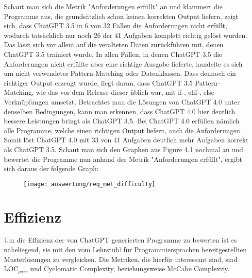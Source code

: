 \documentclass[class=scrbook, crop=false]{standalone}
\begin{document}
    Schaut man sich die Metrik "Anforderungen erfüllt" an und klammert die Programme aus, die grundsätzlich schon keinen korrekten Output liefern,
    zeigt sich, dass ChatGPT 3.5 in 6 von 32 Fällen die Anforderungen nicht erfüllt, wodurch tatsächlich nur noch 26 der 41 Aufgaben komplett richtig gelöst wurden.
    Das lässt sich vor allem auf die veralteten Daten zurückführen mit, denen ChatGPT 3.5 trainiert wurde.
    In allen Fällen, in denen ChatGPT 3.5 die Anforderungen nicht erfüllte aber eine richtige Ausgabe lieferte, handelte es sich um nicht
    verwendetes Pattern-Matching oder Datenklassen.
    Dass dennoch ein richtiger Output erzeugt wurde, liegt daran, dass ChatGPT 3.5 Pattern-Matching, wie das vor dem
    Release dieser üblich war, mit if-, elif-, else-Verknüpfungen umsetzt.
    Betrachtet man die Lösungen von ChatGPT 4.0 unter denselben Bedingungen, kann man erkennen, dass ChatGPT 4.0 hier deutlich
    bessere Leistungen bringt als ChatGPT 3.5.
    Bei ChatGPT 4.0 erfüllen nämlich alle Programme, welche einen richtigen Output liefern, auch die Anforderungen.
    Somit löst ChatGPT 4.0 mit 33 von 41 Aufgaben deutlich mehr Aufgaben korrekt als ChatGPT 3.5.
    Schaut man sich den Graphen aus Figure 4.1 nochmal an und bewertet die Programme nun anhand der Metrik "Anforderungen erfüllt", ergibt sich daraus der folgende Graph:
    \begin{figure}[H]
        \centering
        \texttt{[image: auswertung/req\_met\_difficulty]}
        \caption{}
        \label{fig:2}
    \end{figure}


\section{Effizienz}
\label{sec:effizienz}
    Um die Effizienz der von ChatGPT generierten Programme zu bewerten ist es naheliegend, sie mit den vom Lehrstuhl für
    Programmiersprachen bereitgestellten Musterlösungen zu vergleichen.
    Die Metriken, die hierfür interessant sind, sind LOC$_{pars}$ und Cyclomatic Complexity, beziehungsweise McCabe Complexity.
\end{document}
